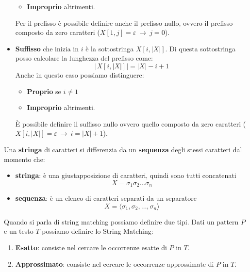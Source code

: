 \begin{definizione}
\begin{itemize}
\begin{itemize}
                  \item \textbf{Improprio} altrimenti.
              \end{itemize}
              Per il prefisso è possibile definire anche il prefisso nullo, ovvero il
              prefisso composto da zero caratteri ($X[1, j]=\varepsilon \ \to \ j = 0$).
        \item \textbf{Suffisso} che inizia in $i$ è la sottostringa $X[i,|X|]$.
              Di questa sottostringa posso calcolare la lunghezza del prefisso come:
              \begin{equation}
                  |X[i,|X|]| = |X| - i + 1
              \end{equation}
              Anche in questo caso possiamo distinguere:
              \begin{itemize}
                  \item \textbf{Proprio} se $i \neq 1$
                  \item \textbf{Improprio} altrimenti.
              \end{itemize}
              È possibile definire il suffisso nullo ovvero quello composto da zero
              caratteri ($X[i,|X|]=\varepsilon \ \to \ i = |X| + 1$).
    \end{itemize}
\end{definizione}
\begin{nota}
    Una \textbf{stringa} di caratteri si differenzia da un \textbf{sequenza}
    degli stessi caratteri dal momento che:
    \begin{itemize}
        \item \textbf{stringa}: è una giustapposizione di caratteri, quindi sono
              tutti concatenati
              \begin{equation}
                  X = \sigma_1\sigma_2\dots\sigma_n
              \end{equation}
        \item \textbf{sequenza}: è un elenco di caratteri separati da un separatore
              \begin{equation}
                  X= \langle\sigma_1,\sigma_2,\dots,\sigma_n\rangle
              \end{equation}
    \end{itemize}
\end{nota}
Quando si parla di string matching possiamo definire due tipi. Dati un pattern
$P$ e un testo $T$ possiamo definire lo String Matching:
\begin{enumerate}
    \item \textbf{Esatto}: consiste nel cercare le occorrenze esatte di $P$ in $T$.
    \item \textbf{Approssimato}: consiste nel cercare le occorrenze approssimate
          di $P$ in $T$.
\end{enumerate}

